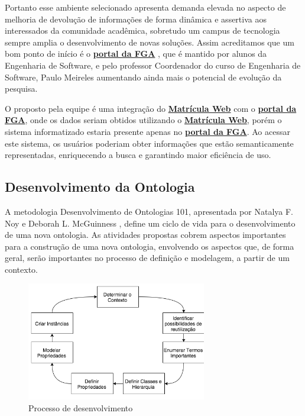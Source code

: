 	Portanto esse ambiente selecionado apresenta demanda elevada no aspecto de melhoria de devolução de informações de forma dinâmica e assertiva aos interessados da comunidade acadêmica, sobretudo um campus de tecnologia sempre amplia o desenvolvimento de novas soluções. Assim acreditamos que um bom ponto de início é o \href{https://fga.unb.br/}{\textbf{portal da FGA}} , que é mantido por alunos da Engenharia de Software, e pelo professor Coordenador do curso de Engenharia de Software, Paulo Meireles aumentando ainda mais o potencial de evolução da pesquisa.

	O proposto pela equipe é uma integração do \href{http://matriculaweb.unb.br}{\textbf{Matrícula Web}} com o \href{https://fga.unb.br/}{\textbf{portal da FGA}}, onde os dados seriam obtidos utilizando o \href{http://matriculaweb.unb.br}{\textbf{Matrícula Web}}, porém o sistema informatizado estaria presente apenas no \href{https://fga.unb.br/}{\textbf{portal da FGA}}. Ao acessar este sistema, os usuários poderiam obter informações que estão semanticamente representadas, enriquecendo a busca e garantindo maior eficiência de uso.


\subsection{Desenvolvimento da Ontologia}

A metodologia Desenvolvimento de Ontologias 101, apresentada por Natalya F. Noy e Deborah L. McGuinness \cite{noy2001ontology}, define um ciclo de vida para o desenvolvimento de uma nova ontologia. As atividades propostas cobrem aspectos importantes para a construção de uma nova ontologia, envolvendo os aspectos que, de forma geral, serão importantes no processo de definição e modelagem, a partir de um contexto.

\begin{figure}[H]
	\centering
	\includegraphics[width=0.7\textwidth]{imagens/desenvolvimento}
	\caption{Processo de desenvolvimento}
	\label{img:desenvolvimento}
\end{figure}

